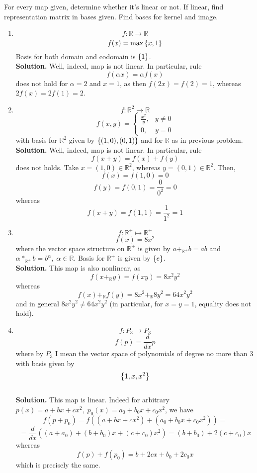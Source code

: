 \documentclass[12pt,fleqn]{article} %
\title{}
\begin{document}
\maketitle
For every map given, determine whether it's linear or not. If linear, find representation matrix in bases given. Find bases for kernel and
image.
\begin{enumerate}
\item \[f:\mathbb{R}\to\mathbb{R}\]
	\[f(x)=\max\mycbra{x,1}\]
Basis for both domain and codomain is $\left\{1\right\}$.
\\\textbf{Solution.} Well, indeed, map is not linear. In particular, rule 
\[f(\alpha x)=\alpha f(x)\]
does not hold for $\alpha=2$ and $x=1$, as then $f(2x)=f(2)=1$, whereas $2f(x)=2f(1)=2$.
\item \[f:\mathbb{R}^2\to\mathbb{R}\]
	\[f(x,y)=\left\{\begin{array}{ll}
		\frac{x^2}{y},&y\neq0\\
		0,&y=0
	\end{array}\right.\]
	with basis for $\mathbb{R}^2$ given by $\left\{(1,0),(0,1)\right\}$ and for $\mathbb{R}$ as in previous problem.
\\\textbf{Solution.} Well, indeed, map is not linear. In particular, rule 
\[f(x+y)=f(x)+f(y)\]
does not holds. Take $x=(1,0)\in\mathbb{R}^2$, whereas $y=(0,1)\in\mathbb{R}^2$. Then, 
\[f(x)=f(1,0)=0\]
\[f(y)=f(0,1)=\frac{0}{0^2}=0\]
whereas
\[f(x+y)=f(1,1)=\frac{1}{1^2}=1\]
\item \[f:\mathbb{R}^+\mapsto\mathbb{R}^+\]
	\[f(x)=8x^2\]
	where the vector space structure on $\mathbb{R}^+$ is given by $a+_{\mathbb{R}^+}b=ab$ and $\alpha*_{\mathbb{R}^+}b=b^{\alpha},\;\alpha
	\in\mathbb{R}$. Basis for $\mathbb{R}^+$ is given by $\left\{e\right\}$.
	\\\textbf{Solution.} 
	This map is also nonlinear, as 
	\[f(x+_{\mathbb{R}}y)=f(xy)=8x^2y^2\]
	whereas
	\[f(x)+_{\mathbb{R}}f(y)=8x^2+_{\mathbb{R}}8y^2=64x^2y^2\]
	and in general $8x^2y^2\neq64x^2y^2$ (in particular, for $x=y=1$, equality does not hold).
\item \[f:P_3\to P_3\]
	\[f(p)=\frac{d}{dx}p\]
	where by $P_3$ I mean the vector space of polynomials of degree no more than 3 with basis given by
	\[\left\{1,x,x^2\right\}\]
	\\\textbf{Solution.} 
	This map is linear. Indeed for arbitrary $p(x)=a+bx+cx^2,\;p_0(x)=a_0+b_0x+c_0x^2$, we have
	\[f(p+p_0)=f((a+bx+cx^2)+(a_0+b_0x+c_0x^2))=\]\[=\frac{d}{dx}((a+a_0)+(b+b_0)x+(c+c_0)x^2)=(b+b_0)+2(c+c_0)x\]
	whereas
	\[f(p)+f(p_0)=b+2cx+b_0+2c_0x\]
	which is precisely the same.

\end{enumerate}
\end{document}
